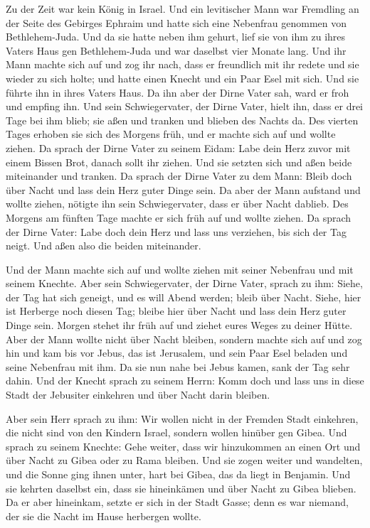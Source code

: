  Zu der Zeit war kein König in Israel. Und ein levitischer
Mann war Fremdling an der Seite des Gebirges Ephraim und hatte sich eine
Nebenfrau genommen von Bethlehem-Juda.  Und da sie hatte
neben ihm gehurt, lief sie von ihm zu ihres Vaters Haus gen
Bethlehem-Juda und war daselbst vier Monate lang.  Und ihr
Mann machte sich auf und zog ihr nach, dass er freundlich mit ihr redete
und sie wieder zu sich holte; und hatte einen Knecht und ein Paar Esel
mit sich. Und sie führte ihn in ihres Vaters Haus. Da ihn aber der Dirne
Vater sah, ward er froh und empfing ihn.  Und sein
Schwiegervater, der Dirne Vater, hielt ihn, dass er drei Tage bei ihm
blieb; sie aßen und tranken und blieben des Nachts da. 
Des vierten Tages erhoben sie sich des Morgens früh, und er machte sich
auf und wollte ziehen. Da sprach der Dirne Vater zu seinem Eidam: Labe
dein Herz zuvor mit einem Bissen Brot, danach sollt ihr ziehen.
 Und sie setzten sich und aßen beide miteinander und
tranken. Da sprach der Dirne Vater zu dem Mann: Bleib doch über Nacht
und lass dein Herz guter Dinge sein.  Da aber der Mann
aufstand und wollte ziehen, nötigte ihn sein Schwiegervater, dass er
über Nacht dablieb.  Des Morgens am fünften Tage machte er
sich früh auf und wollte ziehen. Da sprach der Dirne Vater: Labe doch
dein Herz und lass uns verziehen, bis sich der Tag neigt. Und aßen also
die beiden miteinander.

 Und der Mann machte sich auf und wollte ziehen mit seiner
Nebenfrau und mit seinem Knechte. Aber sein Schwiegervater, der Dirne
Vater, sprach zu ihm: Siehe, der Tag hat sich geneigt, und es will Abend
werden; bleib über Nacht. Siehe, hier ist Herberge noch diesen Tag;
bleibe hier über Nacht und lass dein Herz guter Dinge sein. Morgen
stehet ihr früh auf und ziehet eures Weges zu deiner Hütte.
 Aber der Mann wollte nicht über Nacht bleiben, sondern
machte sich auf und zog hin und kam bis vor Jebus, das ist Jerusalem,
und sein Paar Esel beladen und seine Nebenfrau mit ihm. 
Da sie nun nahe bei Jebus kamen, sank der Tag sehr dahin. Und der Knecht
sprach zu seinem Herrn: Komm doch und lass uns in diese Stadt der
Jebusiter einkehren und über Nacht darin bleiben.

 Aber sein Herr sprach zu ihm: Wir wollen nicht in der
Fremden Stadt einkehren, die nicht sind von den Kindern Israel, sondern
wollen hinüber gen Gibea.  Und sprach zu seinem Knechte:
Gehe weiter, dass wir hinzukommen an einen Ort und über Nacht zu Gibea
oder zu Rama bleiben.  Und sie zogen weiter und
wandelten, und die Sonne ging ihnen unter, hart bei Gibea, das da liegt
in Benjamin.  Und sie kehrten daselbst ein, dass sie
hineinkämen und über Nacht zu Gibea blieben. Da er aber hineinkam,
setzte er sich in der Stadt Gasse; denn es war niemand, der sie die
Nacht im Hause herbergen wollte.

